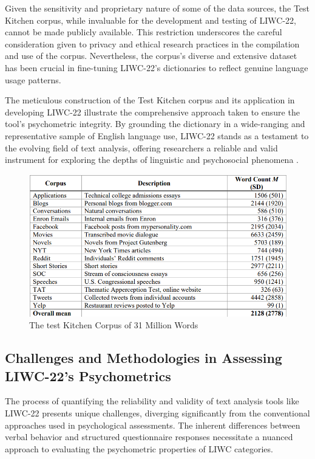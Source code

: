 Given the sensitivity and proprietary nature of some of the data sources, the Test Kitchen corpus, while invaluable for the development and testing of LIWC-22, cannot be made publicly available. This restriction underscores the careful consideration given to privacy and ethical research practices in the compilation and use of the corpus. Nevertheless, the corpus's diverse and extensive dataset has been crucial in fine-tuning LIWC-22's dictionaries to reflect genuine language usage patterns.

The meticulous construction of the Test Kitchen corpus and its application in developing LIWC-22 illustrate the comprehensive approach taken to ensure the tool's psychometric integrity. By grounding the dictionary in a wide-ranging and representative sample of English language use, LIWC-22 stands as a testament to the evolving field of text analysis, offering researchers a reliable and valid instrument for exploring the depths of linguistic and psychosocial phenomena \cite{boyd2022development}.

\begin{figure}[htbp]
	\centering
		\includegraphics[scale=0.65]{./figures/test-kitchen-corpus.png}
	\caption{The test Kitchen Corpus of 31 Million Words \cite{boyd2022development}}
	\label{FigKitchenCorpus}
\end{figure}

\subsection{Challenges and Methodologies in Assessing LIWC-22's Psychometrics}

\quad The process of quantifying the reliability and validity of text analysis tools like LIWC-22 presents unique challenges, diverging significantly from the conventional approaches used in psychological assessments. The inherent differences between verbal behavior and structured questionnaire responses necessitate a nuanced approach to evaluating the psychometric properties of LIWC categories.

